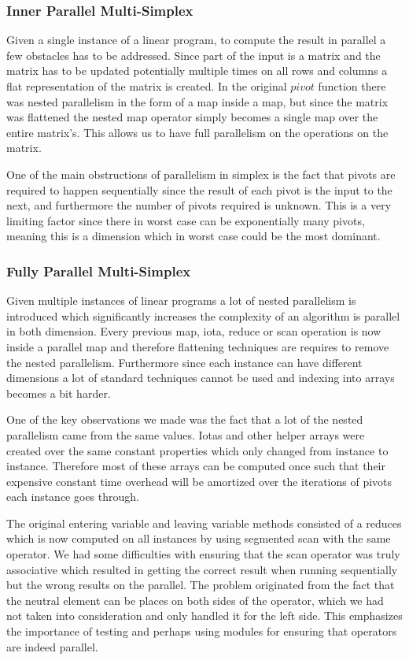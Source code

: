 \subsubsection{Inner Parallel Multi-Simplex}
Given a single instance of a linear program, to compute the result in parallel a few obstacles has to be addressed. Since part of the input is a matrix and the matrix has to be updated potentially multiple times on all rows and columns a flat representation of the matrix is created. In the original $pivot$ function there was nested parallelism in the form of a map inside a map, but since the matrix was flattened the nested map operator simply becomes a single map over the entire matrix's. This allows us to have full parallelism on the operations on the matrix. 

One of the main obstructions of parallelism in simplex is the fact that pivots are required to happen sequentially since the result of each pivot is the input to the next, and furthermore the number of pivots required is unknown. This is a very limiting factor since there in worst case can be exponentially many pivots, meaning this is a dimension which in worst case could be the most dominant.

\subsubsection{Fully Parallel Multi-Simplex}
Given multiple instances of linear programs a lot of nested parallelism is introduced which significantly increases the complexity of an algorithm is parallel in both dimension. Every previous map, iota, reduce or scan operation is now inside a parallel map and therefore flattening techniques are requires to remove the nested parallelism. Furthermore since each instance can have different dimensions a lot of standard techniques cannot be used and indexing into arrays becomes a bit harder.

One of the key observations we made was the fact that a lot of the nested parallelism came from the same values. Iotas and other helper arrays were created over the same constant properties which only changed from instance to instance. Therefore most of these arrays can be computed once such that their expensive constant time overhead will be amortized over the iterations of pivots each instance goes through.

The original entering variable and leaving variable methods consisted of a reduces which is now computed on all instances by using segmented scan with the same operator. We had some difficulties with ensuring that the scan operator was truly associative which resulted in getting the correct result when running sequentially but the wrong results on the parallel. The problem originated from the fact that the neutral element can be places on both sides of the operator, which we had not taken into consideration and only handled it for the left side. This emphasizes the importance of testing and perhaps using modules for ensuring that operators are indeed parallel.

